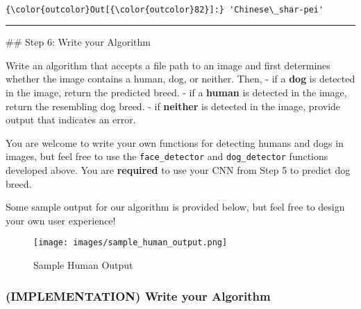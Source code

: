 \documentclass[11pt]{article}
\makeatletter
\def\maxwidth{\ifdim\Gin@nat@width>\linewidth\linewidth
    \else\Gin@nat@width\fi}
\let\Oldincludegraphics\includegraphics
\renewcommand{\includegraphics}[1]{\Oldincludegraphics[width=.8\maxwidth]{#1}}
\makeatother
\begin{document}
    \begin{center}
    \end{center}
    { \hspace*{\fill} \\}
    
\begin{Verbatim}[commandchars=\\\{\}]
{\color{outcolor}Out[{\color{outcolor}82}]:} 'Chinese\_shar-pei'
\end{Verbatim}
            
    \begin{center}\rule{0.5\linewidth}{\linethickness}\end{center}

 \#\# Step 6: Write your Algorithm

Write an algorithm that accepts a file path to an image and first
determines whether the image contains a human, dog, or neither. Then, -
if a \textbf{dog} is detected in the image, return the predicted breed.
- if a \textbf{human} is detected in the image, return the resembling
dog breed. - if \textbf{neither} is detected in the image, provide
output that indicates an error.

You are welcome to write your own functions for detecting humans and
dogs in images, but feel free to use the \texttt{face\_detector} and
\texttt{dog\_detector} functions developed above. You are
\textbf{required} to use your CNN from Step 5 to predict dog breed.

Some sample output for our algorithm is provided below, but feel free to
design your own user experience!

\begin{figure}
\centering
\texttt{[image: images/sample\_human\_output.png]}
\caption{Sample Human Output}
\end{figure}

\subsubsection{(IMPLEMENTATION) Write your
Algorithm}\label{implementation-write-your-algorithm}
\end{document}

